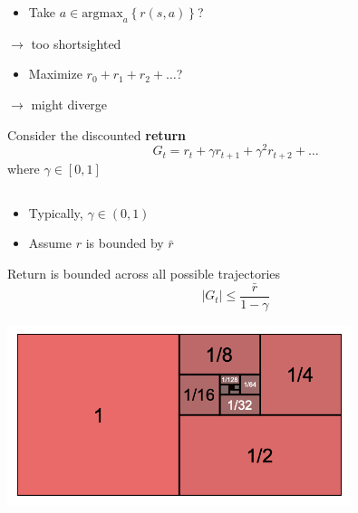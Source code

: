 \documentclass[
  letterpaper,
  DIV=11,
  numbers=noendperiod,
  oneside]{scrartcl}
\providecommand{\tightlist}{%
  \setlength{\itemsep}{0pt}\setlength{\parskip}{0pt}}\usepackage{longtable,booktabs,array}
\begin{document}
\begin{itemize}
\tightlist
\item
  Take \(a \in \text{argmax}_{a} \left\{ r(s,a) \right\}\)?
\end{itemize}

\(\rightarrow\) too shortsighted

\begin{itemize}
\tightlist
\item
  Maximize \(r_0 + r_1 + r_2 + \ldots\)?
\end{itemize}

\(\rightarrow\) might diverge

Consider the discounted \textbf{return}
\[G_t = r_t + \gamma r_{t+1} + \gamma^2 r_{t+2} + \ldots\] where
\(\gamma \in [0,1]\)

\subsection{}\label{section-4}

\begin{itemize}
\tightlist
\item
  Typically, \(\gamma \in (0,1)\)
\item
  Assume \(r\) is bounded by \(\bar{r}\)
\end{itemize}

Return is bounded across all possible trajectories
\[\lvert G_t \rvert \leq \frac{\bar{r}}{1 - \gamma}\]

\begin{center}
\includegraphics[width=\textwidth,height=2.08333in]{figs/geometric.png}
\end{center}

\end{document}
